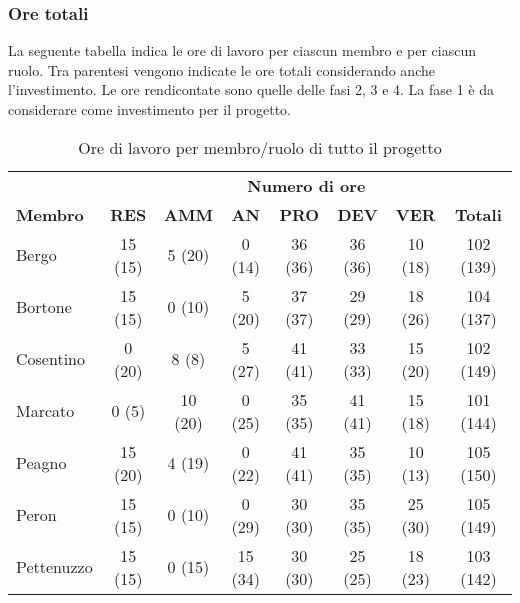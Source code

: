 	\subsubsection{Ore totali}
		La seguente tabella indica le ore di lavoro per ciascun membro e per ciascun ruolo. Tra parentesi vengono indicate le ore totali considerando anche l'investimento. Le ore rendicontate sono quelle delle fasi 2, 3 e 4. La fase 1 è da considerare come investimento per il progetto.
		\begin{table}[h]
			\centering
			\begin{tabular}{| l | c c c c c c | c |}
				\rowcolor{LightBlue}
				& \multicolumn{7}{c}{\textbf{\color{white}Numero di ore}}	\\
		
				\rowcolor{LightBlue}
				\textbf{\color{white}Membro}
				& \textbf{\color{white}RES}
				& \textbf{\color{white}AMM}
				& \textbf{\color{white}AN}
				& \textbf{\color{white}PRO}
				& \textbf{\color{white}DEV}
				& \textbf{\color{white}VER}
				& \textbf{\color{white}Totali}\\
		
				Bergo 				& 15 (15) & 5 (20)		& 0 (14)	& 36 (36) & 36 (36) & 10 (18)	& 102 (139)\\
				Bortone 			& 15  (15)  & 0 (10)		& 5	 (20)	& 37 (37) & 29 (29) & 18 (26)	& 104 (137)\\
				Cosentino 		& 0  (20) & 8 (8)		& 5 (27)	& 41 (41) & 33 (33) & 15  (20)	& 102 (149)\\
				Marcato 			& 0 (5) & 10 (20)		& 0  (25)	& 35 (35) & 41 (41) & 15 (18)	& 101 (144)\\
				Peagno 			& 15  (20) & 4 (19)		& 0  (22)	& 41 (41) & 35 (35) & 10 (13)	& 105 (150)\\
				Peron 				& 15 (15) & 0 (10)		& 0  (29)	& 30 (30) & 35 (35) & 25  (30)	& 105 (149)\\
				Pettenuzzo 	& 15 (15) & 0 (15) 	& 15  (34)	& 30 (30) & 25 (25) & 18 (23)	& 103 (142)\\ \hline
			\end{tabular}
			\caption{Ore di lavoro per membro/ruolo di tutto il progetto}
		\end{table}
	
